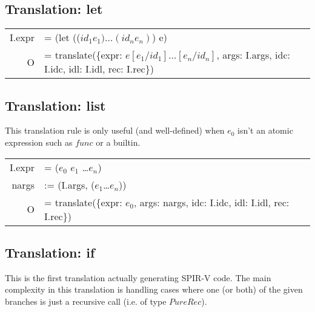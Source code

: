 \documentclass[letterpaper,12pt]{article}
\begin{document}
\subsection{Translation: let}

\begin{tabularx}{\linewidth}{rl}
	I.expr &= (let (($id_1 e_1) \dots (id_n e_n)$) e) \\
	O &= translate(\{expr: $e[e_1 / id_1]\dots[e_n / id_n]$, args: I.args, idc: I.idc, idl: I.idl, rec: I.rec\}) \\
\end{tabularx}

\subsection{Translation: list}

This translation rule is only useful (and well-defined) when $e_0$ isn't
an atomic expression such as $func$ or a builtin. \\

\medskip
\begin{tabularx}{\linewidth}{rl}
	I.expr &= ($e_0$ $e_1$ \dots $e_n$) \\
	nargs &:= (I.args, ($e_1$\dots$e_n$)) \\
	O &= translate(\{expr: $e_0$, args: nargs, idc: I.idc, idl: I.idl, rec: I.rec\}) \\
\end{tabularx}

\subsection{Translation: if}

This is the first translation actually generating SPIR-V code. The main
complexity in this translation is handling cases where one (or both) of the
given branches is just a recursive call (i.e. of type $PureRec$).
\end{document}
